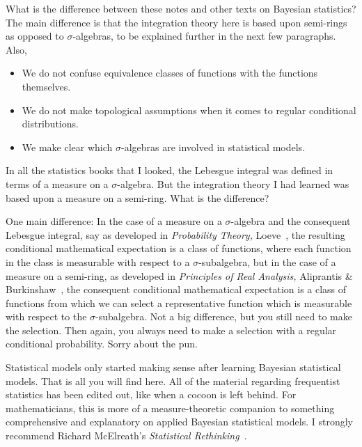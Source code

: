 \documentclass[
twoside=true,
paper=letter,
fontsize=9pt,
pagesize=auto,
leqno,
openany,
headsepline,
overfullrule,
]{scrbook}
\theoremstyle{plain}
\theoremstyle{plain}
\theoremstyle{definition}
\theoremstyle{bfnoteitalic}
\theoremstyle{bfnoteroman}
\newcommand{\textsigma}{\hbox{\large{$\sigma$}}\kern-1pt}
\begin{document}
What is the difference between these notes and other texts on Bayesian statistics?
The main difference is that the integration theory here is based upon semi-rings as opposed to \textsigma\hyp{}algebras, to be explained further in the next few paragraphs.
Also,
\begin{itemize}
\item
We do not confuse equivalence classes of functions with the functions themselves.
\item
We do not make topological assumptions when it comes to regular conditional distributions.
\item
We make clear which \textsigma\hyp{}algebras are involved in statistical models.
\end{itemize}


In all  the statistics books that I looked, the Lebesgue integral was defined in terms of a measure on a  \textsigma\hyp{}algebra.
But the integration theory I had learned was based upon a measure on a  semi-ring.
What is the difference?

One main difference: In the case of a measure on a  \textsigma\hyp{}algebra and the consequent Lebesgue integral, say as developed in \textsl{Probability Theory,} Loeve~\cite{pt_loeve_1960}, the resulting conditional mathematical expectation is a class of functions, where each function in the class is measurable with respect to a
\textsigma\hyp{}subalgebra, but in the case of a measure on a semi-ring, as developed in
\textsl{Principles of Real Analysis,} Aliprantis \& Burkinshaw~\cite{pora_aliprantis_1990}, the consequent conditional mathematical expectation is a class of functions from which we can select a representative function which is measurable with respect to the  \textsigma\hyp{}subalgebra.  Not a big difference, but you still need to make the selection. Then again, you always need to make a selection with a regular conditional probability. Sorry about the pun.





Statistical models only started making sense after learning Bayesian statistical models.  That is all you will find here. All of the material regarding frequentist statistics has been edited out, like when a cocoon is left behind.
For mathematicians, this is more of a measure-theoretic companion to something  comprehensive and explanatory on applied Bayesian statistical models.  I strongly recommend Richard McElreath's \textsl{Statistical Rethinking}~\cite{sr_mcelreath_2020}.
\end{document}
